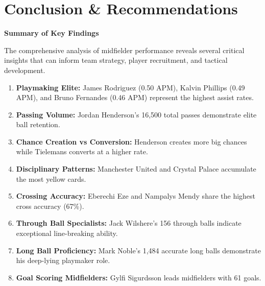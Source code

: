\documentclass[12pt,a4paper]{article}
\begin{document}
\section{Conclusion \& Recommendations}

\begin{tcolorbox}[colback=lightgray, colframe=primary, arc=5pt, boxrule=1.5pt]
\centering
\textcolor{primary}{\textbf{\Large Summary of Key Findings}}
\end{tcolorbox}

\vspace{0.5cm}

\begin{tcolorbox}[colback=lightgray, colframe=secondary, arc=5pt, boxrule=1pt]
The comprehensive analysis of midfielder performance reveals several critical insights that can inform team strategy, player recruitment, and tactical development.
\end{tcolorbox}

\vspace{0.3cm}

\begin{enumerate}
    \item \textbf{Playmaking Elite:} James Rodriguez (0.50 APM), Kalvin Phillips (0.49 APM), and Bruno Fernandes (0.46 APM) represent the highest assist rates.
    
    \item \textbf{Passing Volume:} Jordan Henderson's 16,500 total passes demonstrate elite ball retention.
    
    \item \textbf{Chance Creation vs Conversion:} Henderson creates more big chances while Tielemans converts at a higher rate.
    
    \item \textbf{Disciplinary Patterns:} Manchester United and Crystal Palace accumulate the most yellow cards.
    
    \item \textbf{Crossing Accuracy:} Eberechi Eze and Nampalys Mendy share the highest cross accuracy (67\%).
    
    \item \textbf{Through Ball Specialists:} Jack Wilshere's 156 through balls indicate exceptional line-breaking ability.
    
    \item \textbf{Long Ball Proficiency:} Mark Noble's 1,484 accurate long balls demonstrate his deep-lying playmaker role.
    
    \item \textbf{Goal Scoring Midfielders:} Gylfi Sigurdsson leads midfielders with 61 goals.
\end{enumerate}
\end{document}
